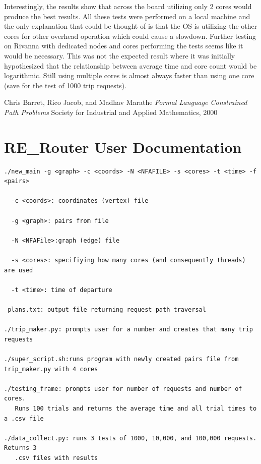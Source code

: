 \documentclass[English]{article}
\theoremstyle{remark}
\numberwithin{equation}{section}
\begin{document}
Interestingly, the results show that across the board utilizing only 2 cores would produce the best results. All these tests were performed on a local machine and the only explanation that could be thought of is that the OS is utilizing the other cores for other overhead operation which could cause a slowdown. Further testing on Rivanna with dedicated nodes and cores performing the tests seems like it would be necessary. This was not the expected result where it was initially hypothesized that the relationship between average time and core count would be logarithmic. Still using multiple cores is almost always faster than using one core (save for the test of 1000 trip requests). 


\begin{thebibliography}{9}
Chris Barret, Rico Jacob, and Madhav Marathe
\textit{Formal Language Constrained Path Problems}
Society for Industrial and Applied Mathematics, 2000
\end{thebibliography}

\cleardoublepage
\appendix

\section{RE\_Router User Documentation}
\label{sec:documentation}


\begin{verbatim}
./new_main -g <graph> -c <coords> -N <NFAFILE> -s <cores> -t <time> -f <pairs>

  -c <coords>: coordinates (vertex) file
  
  -g <graph>: pairs from file

  -N <NFAFile>:graph (edge) file

  -s <cores>: specifiying how many cores (and consequently threads) are used
  
  -t <time>: time of departure
  
 plans.txt: output file returning request path traversal
 
./trip_maker.py: prompts user for a number and creates that many trip requests

./super_script.sh:runs program with newly created pairs file from trip_maker.py with 4 cores

./testing_frame: prompts user for number of requests and number of cores. 
   Runs 100 trials and returns the average time and all trial times to a .csv file

./data_collect.py: runs 3 tests of 1000, 10,000, and 100,000 requests. Returns 3
   .csv files with results

  
\end{verbatim}
\end{document}
